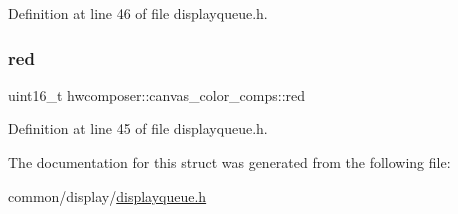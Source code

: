 Definition at line 46 of file displayqueue.\+h.

\mbox{\label{structhwcomposer_1_1canvas__color__comps_a1fe32ff54751b722cf22aa5552bbf639}} 
\subsubsection{\texorpdfstring{red}{red}}
{\footnotesize\ttfamily uint16\+\_\+t hwcomposer\+::canvas\+\_\+color\+\_\+comps\+::red}



Definition at line 45 of file displayqueue.\+h.



The documentation for this struct was generated from the following file\+:\begin{DoxyCompactItemize}
\item 
common/display/\mbox{\hyperlink{displayqueue_8h}{displayqueue.\+h}}\end{DoxyCompactItemize}
